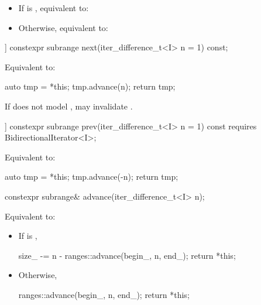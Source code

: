 \begin{addedblock}
\begin{itemdescr}
\pnum
\effects
\begin{itemize}
\item If  is , equivalent to: 
\item Otherwise, equivalent to: 
\end{itemize}
\end{itemdescr}

%
\begin{itemdecl}
[[nodiscard]] constexpr subrange next(iter_difference_t<I> n = 1) const;
\end{itemdecl}

\begin{itemdescr}
\pnum
\effects Equivalent to:
\begin{codeblock}
auto tmp = *this;
tmp.advance(n);
return tmp;
\end{codeblock}

\pnum
\begin{note}
If  does not model , 
may invalidate .
\end{note}
\end{itemdescr}

%
\begin{itemdecl}
[[nodiscard]] constexpr subrange prev(iter_difference_t<I> n = 1) const
  requires BidirectionalIterator<I>;
\end{itemdecl}

\begin{itemdescr}
\pnum
\effects Equivalent to:
\begin{codeblock}
auto tmp = *this;
tmp.advance(-n);
return tmp;
\end{codeblock}
\end{itemdescr}

%
\begin{itemdecl}
constexpr subrange& advance(iter_difference_t<I> n);
\end{itemdecl}

\begin{itemdescr}
\pnum
\effects Equivalent to:
\begin{itemize}
\item If  is ,
\begin{codeblock}
size_ -= n - ranges::advance(begin_, n, end_);
return *this;
\end{codeblock}
\item Otherwise,
\begin{codeblock}
ranges::advance(begin_, n, end_);
return *this;
\end{codeblock}
\end{itemize}
\end{itemdescr}


\end{addedblock}
